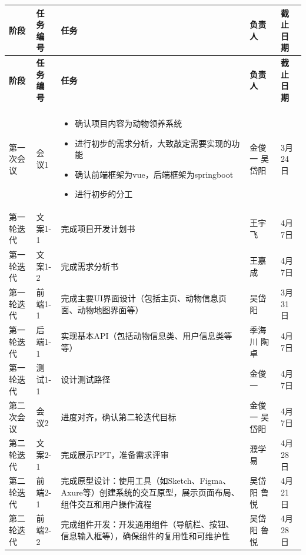 \documentclass[12pt,a4paper,UTF8]{article}
\begin{document}
\begin{xltabular}{\linewidth}{|>{\centering\arraybackslash}p{2.2cm}|>{\centering\arraybackslash}p{2cm}|>{\raggedright\arraybackslash}p{6cm}|>{\centering\arraybackslash}p{1.5cm}|>{\centering\arraybackslash}p{2cm}|}
  \hline
  \textbf{阶段} & \textbf{任务编号} & \textbf{任务} & \textbf{负责人} & \textbf{截止日期} \\ \hline 
  \endfirsthead
  
  \hline
  \textbf{阶段} & \textbf{任务编号} & \textbf{任务} & \textbf{负责人} & \textbf{截止日期} \\ \hline  
  \endhead
  
  \hline
   \\ 
  \endfoot

  \hline \endlastfoot

  第一次会议 & 会议1 & 
  \vspace{-0.5em}
  \begin{itemize}[topsep=0pt, partopsep=0pt, left=0pt, nosep]
    \item 确认项目内容为动物领养系统
    \item 进行初步的需求分析，大致敲定需要实现的功能
    \item 确认前端框架为vue，后端框架为springboot
    \item 进行初步的分工
  \end{itemize}
  & 金俊一 吴岱阳 & 3月24日 \\ \hline
  第一轮迭代 & 文案1-1 & 完成项目开发计划书 & 王宇飞 & 4月7日 \\ \hline
  第一轮迭代 & 文案1-2 & 完成需求分析书 & 王嘉成 & 4月7日 \\ \hline
  第一轮迭代 & 前端1-1 & 完成主要UI界面设计（包括主页、动物信息页面、动物地图界面等） & 吴岱阳 & 3月31日 \\ \hline
  第一轮迭代 & 后端1-1 & 实现基本API（包括动物信息类、用户信息类等等） & 季海川 陶卓 & 4月7日 \\ \hline
  第一轮迭代 & 测试1-1 & 设计测试路径 & 金俊一 & 4月7日 \\ \hline
  第二次会议 & 会议2 & 进度对齐，确认第二轮迭代目标 & 金俊一 吴岱阳 & 4月7日 \\ \hline
  第二轮迭代 & 文案2-1 & 完成展示PPT，准备需求评审 & 濮学易 & 4月28日 \\ \hline
  第二轮迭代 & 前端2-1 & 完成原型设计：使用工具（如Sketch、Figma、Axure等）创建系统的交互原型，展示页面布局、组件交互和用户操作流程 & 吴岱阳 鲁悦 & 4月21日 \\ \hline
  第二轮迭代 & 前端2-2 & 完成组件开发：开发通用组件（导航栏、按钮、信息输入框等），确保组件的复用性和可维护性 & 吴岱阳 鲁悦 & 4月28日 \\ \hline

\end{xltabular}
\end{document}
